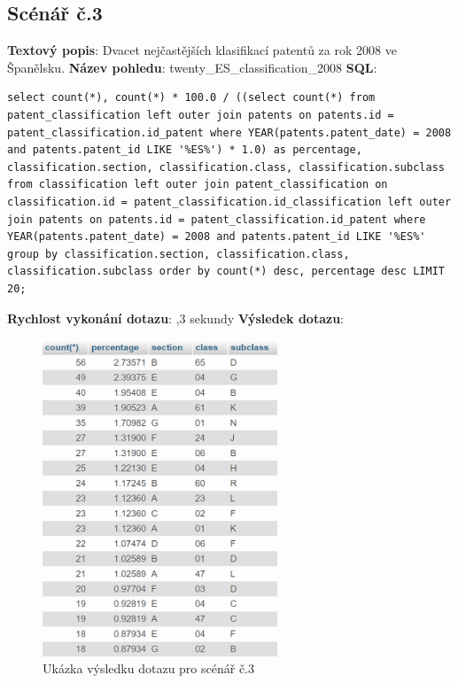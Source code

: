 \subsection{Scénář č.3}
\textbf{Textový popis}: Dvacet nejčastějších klasifikací patentů za rok 2008 ve Španělsku.
\newline
\textbf{Název pohledu}: twenty\_ES\_classification\_2008
\newline
\textbf{SQL}:
\begin{lstlisting}[label = {lst:elements_a}]
select count(*), count(*) * 100.0 / ((select count(*) from patent_classification left outer join patents on patents.id = patent_classification.id_patent where YEAR(patents.patent_date) = 2008 and patents.patent_id LIKE '%ES%') * 1.0) as percentage, classification.section, classification.class, classification.subclass from classification left outer join patent_classification on classification.id = patent_classification.id_classification left outer join patents on patents.id = patent_classification.id_patent where YEAR(patents.patent_date) = 2008 and patents.patent_id LIKE '%ES%' group by classification.section, classification.class, classification.subclass order by count(*) desc, percentage desc LIMIT 20;
\end{lstlisting}
\textbf{Rychlost vykonání dotazu}: ,3 sekundy
\newline
\textbf{Výsledek dotazu}:
\begin{figure}[H]
\centering
\includegraphics[width=7cm]{img/scenare/scenar_3}
\caption{Ukázka výsledku dotazu pro scénář č.3}
\label{fig:scenar3}
\end{figure}

\newpage
